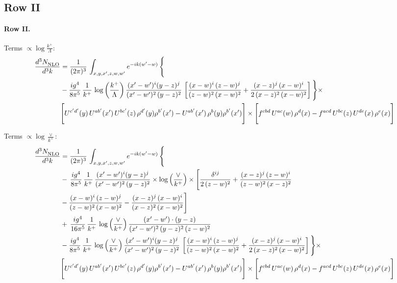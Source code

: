 \documentclass[10pt]{article}
\numberwithin{equation}{section}
\begin{document}
\subsection{Row II}
\paragraph{Row II.}
\noindent Terms $\propto\log\frac{k^+}{\Lambda}$:
\begin{align}
     \frac{d^{3}N_{\rm NLO}^{\rm}}{d^{3}k}  & =   \frac{1}{(2\pi)^{3}}\, \int_{x,y,x',z,w,w^{\prime}} e^{-ik(w^{\prime}-w)}\, \Bigg\{\notag \\
& -\frac{ig^{4}}{8\pi^{5}}\,\frac{1}{k^{+}}\,\log{\left(\frac{k^{+}}{\Lambda}\right)}\,\frac{(x'-w')^{i}(y-z)^{j}}{(x'-w')^{2}\,(y-z)^{2}}\,\left[\frac{(x-w)^{i}\,(z-w)^{j}}{(z-w)^{2}\,(x-w)^{2}}+\frac{(x-z)^{j}\,(x-w)^{i}}{2\,(x-z)^{2}\, (x-w)^{2}}\right]\Bigg\}\times \notag \\ & \Bigg[U^{c'd'}(y)\,U^{ab'}(x')\,U^{bc'}(z)\,\rho^{d'}(y)\rho^{b'}(x')-U^{ab'}(x')\,\rho^{b}(y)\rho^{b'}(x')\Bigg]\times\Bigg[f^{cbd}\,U^{ac}(w)\,\rho^{d}(x)-f^{acd}\, U^{bc}(z)\,U^{de}(x)\,\rho^{e}(x)\Bigg] \label{eq:J:G3II}
\end{align}

\noindent Terms $\propto\log\frac{\vee}{k^+}$:
\begin{align}
     \frac{d^{3}N_{\rm NLO}^{\rm}}{d^{3}k}  & =   \frac{1}{(2\pi)^{3}}\, \int_{x,y,x',z,w,w^{\prime}} e^{-ik(w^{\prime}-w)}\, \Bigg\{\notag \\
& -\,\frac{ig^{4}}{8\pi^{5}}\,\frac{1}{k^{+}}\,\frac{(x'-w')^{i}(y-z)^{j}}{(x'-w')^{2}\,(y-z)^{2}}\times \log{\left(\frac{\vee}{k^{+}}\right)}\times \Bigg[\frac{\delta^{ij}}{2\,(z-w)^{2}}+\frac{(x-z)^{j}\,(z-w)^{i}}{(z-w)^{2}\,(x-z)^{2}}\notag \\ & -\frac{(x-w)^{i}\,(z-w)^{j}}{(z-w)^{2}\,(x-w)^{2}}-\frac{(x-z)^{j}\,(x-w)^{i}}{(x-z)^{2}\,(x-w)^{2}}\Bigg] \notag \\
& +\,\frac{ig^{4}}{16\pi^{5}}\,\frac{1}{k^{+}}\,\log{\left(\frac{\vee}{k^{+}}\right)}\, \frac{(x'-w')\cdot (y-z)}{(x'-w')^{2}\,(y-z)^{2}\,(z-w)^{2}} \notag \\
& -\frac{ig^{4}}{8\pi^{5}}\,\frac{1}{k^{+}}\,\log{\left(\frac{\vee}{k^{+}}\right)}\,\frac{(x'-w')^{i}(y-z)^{j}}{(x'-w')^{2}\,(y-z)^{2}}\,\left[\frac{(x-w)^{i}\,(z-w)^{j}}{(z-w)^{2}\,(x-w)^{2}}+\frac{(x-z)^{j}\,(x-w)^{i}}{2\,(x-z)^{2}\, (x-w)^{2}}\right]\Bigg\}\times \notag \\ & \Bigg[U^{c'd'}(y)\,U^{ab'}(x')\,U^{bc'}(z)\,\rho^{d'}(y)\rho^{b'}(x')-U^{ab'}(x')\,\rho^{b}(y)\rho^{b'}(x')\Bigg]\times\Bigg[f^{cbd}\,U^{ac}(w)\,\rho^{d}(x)-f^{acd}\, U^{bc}(z)\,U^{de}(x)\,\rho^{e}(x)\Bigg] \label{eq:B:G3II}
\end{align}
\end{document}
